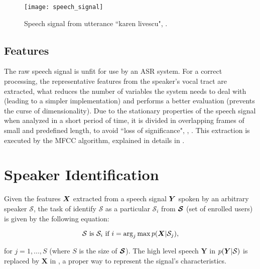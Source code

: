 \begin{figure}[ht]
    \centering
    \texttt{[image: speech\_signal]}
    \caption{Speech signal from utterance ``karen livescu", .}
    \label{fig:speech_signal}
\end{figure}

\subsection{Features}

The raw speech signal is unfit for use by an ASR system. For a correct processing, the representative features from the speaker's vocal tract are extracted, what reduces the number of variables the system needs to deal with (leading to a simpler implementation) and performs a better evaluation (prevents the curse of dimensionality). Due to the stationary properties of the speech signal when analyzed in a short period of time, it is divided in overlapping frames of small and predefined length, to avoid ``loss of significance", , . This extraction is executed by the MFCC algorithm, explained in details in .

\section{Speaker Identification}
\label{sec:speaker-identification}

Given the features $\boldsymbol{X}$ extracted from a speech signal $\boldsymbol{Y}$ spoken by an arbitrary speaker $\mathcal{S}$, the task of identify $\mathcal{S}$ as a particular $\mathcal{S}_i$ from $\boldsymbol{\mathcal{S}}$ (set of enrolled users) is given by the following equation:

\begin{equation}
    \mathcal{S} \text{ is } \mathcal{S}_i \text{ if } i = \arg_j\max\postpdf{\boldsymbol{X}}{\mathcal{S}_j},
    \label{eq:classification_speaker_identification}
\end{equation}

\noindent for $j = 1, ..., S$ (where $S$ is the size of $\boldsymbol{\mathcal{S}}$). The high level speech $\boldsymbol{Y}$ in $p(\boldsymbol{Y}|\mathcal{S})$ is replaced by $\boldsymbol{X}$ in , a proper way to represent the signal's characteristics.

